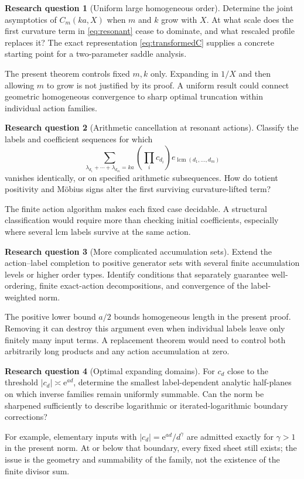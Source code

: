 \documentclass[11pt,a4paper]{article}
\numberwithin{equation}{section}
\theoremstyle{definition}
\newtheorem{question}{Research question}
\theoremstyle{remark}
\newcommand{\ee}{\mathrm e}
\newcommand{\lcm}{\operatorname{lcm}}
\begin{document}
\begin{question}[Uniform large homogeneous order]
Determine the joint asymptotics of $C_m(ka,X)$ when $m$ and $k$ grow
with $X$. At what scale does the first curvature term in
\eqref{eq:resonant} cease to dominate, and what rescaled profile replaces
it? The exact representation \eqref{eq:transformedC} supplies a concrete
starting point for a two-parameter saddle analysis.
\end{question}
The present theorem controls fixed $m,k$ only. Expanding in $1/X$ and
then allowing $m$ to grow is not justified by its proof. A uniform
result could connect geometric homogeneous convergence to sharp
optimal truncation within individual action families.

\begin{question}[Arithmetic cancellation at resonant actions]
Classify the labels and coefficient sequences for which
\[
 \sum_{\lambda_{d_1}+\cdots+\lambda_{d_m}=ka}
 \left(\prod_i c_{d_i}\right)e_{\lcm(d_1,\ldots,d_m)}
\]
vanishes identically, or on specified arithmetic subsequences. How do
totient positivity and M\"obius signs alter the first surviving
curvature-lifted term?
\end{question}
The finite action algorithm makes each fixed case decidable. A
structural classification would require more than checking initial
coefficients, especially where several lcm labels survive at the same
action.

\begin{question}[More complicated accumulation sets]
Extend the action--label completion to positive generator sets with
several finite accumulation levels or higher order types. Identify
conditions that separately guarantee well-ordering, finite exact-action
decompositions, and convergence of the label-weighted norm.
\end{question}
The positive lower bound $a/2$ bounds homogeneous length in the present
proof. Removing it can destroy this argument even when individual
labels leave only finitely many input terms. A replacement theorem
would need to control both arbitrarily long products and any action
accumulation at zero.

\begin{question}[Optimal expanding domains]
For $c_d$ close to the threshold $|c_d|\asymp\ee^{ad}$, determine the
smallest label-dependent analytic half-planes on which inverse families
remain uniformly summable. Can the norm be sharpened sufficiently to
describe logarithmic or iterated-logarithmic boundary corrections?
\end{question}
For example, elementary inputs with
$|c_d|=\ee^{ad}/d^\gamma$ are admitted exactly for $\gamma>1$ in the
present norm. At or below that boundary, every fixed sheet still exists;
the issue is the geometry and summability of the family, not the
existence of the finite divisor sum.
\end{document}
